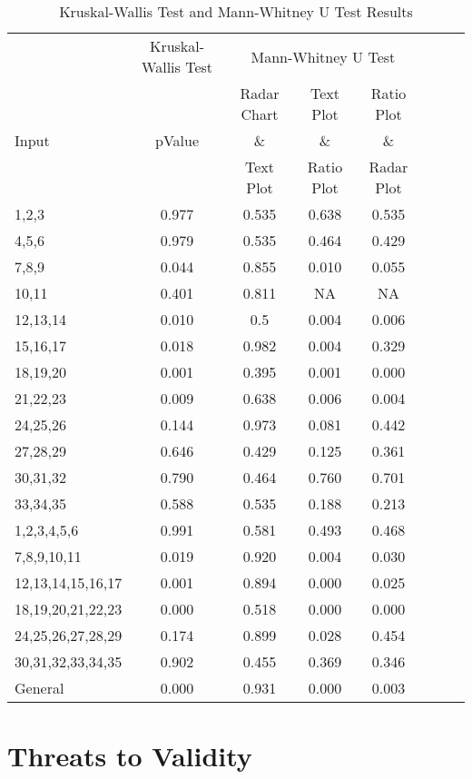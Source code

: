 \begin{table}[ht]
\centering
\begin{tabular}{@{\extracolsep{4pt}}lccccccc}
\toprule   
{} & {Kruskal-Wallis Test} & \multicolumn{3}{c}{Mann-Whitney U Test}\\
 \cmidrule{2-2} 
 \cmidrule{3-5} 
   &  & Radar Chart  & Text Plot  & Ratio Plot   \\ 
Input  & pValue & \&  & \&  & \& \\
   &  & Text Plot & Ratio Plot & Radar Plot\\
\midrule
1,2,3 & 0.977 & 0.535 & 0.638 & 0.535\\ 
4,5,6 & 0.979 & 0.535 & 0.464 & 0.429 \\ 
7,8,9 & 0.044 &  0.855 & 0.010 & 0.055  \\ 
10,11 & 0.401 & 0.811 & NA & NA \\ 
12,13,14 & 0.010 & 0.5 & 0.004 & 0.006  \\ 
15,16,17& 0.018 & 0.982  & 0.004 & 0.329 \\ 
18,19,20 & 0.001 & 0.395 & 0.001 & 0.000  \\ 
21,22,23 & 0.009 & 0.638 & 0.006 & 0.004  \\ 
24,25,26 & 0.144 & 0.973 & 0.081 & 0.442 \\ 
27,28,29 & 0.646 & 0.429 & 0.125 & 0.361 \\ 
30,31,32 & 0.790 & 0.464 & 0.760 & 0.701 \\ 
33,34,35 & 0.588 & 0.535 & 0.188 & 0.213\\ 
 \midrule
1,2,3,4,5,6 & 0.991 & 0.581 & 0.493 & 0.468\\ 
7,8,9,10,11 & 0.019 & 0.920 & 0.004 & 0.030\\ 
12,13,14,15,16,17 & 0.001 & 0.894 & 0.000 & 0.025\\
18,19,20,21,22,23 & 0.000 & 0.518 & 0.000 & 0.000 \\
24,25,26,27,28,29 & 0.174 & 0.899 & 0.028 & 0.454 \\
30,31,32,33,34,35 & 0.902 & 0.455 & 0.369 & 0.346 \\
 \midrule
 General & 0.000 & 0.931 & 0.000 & 0.003 \\
\bottomrule
\end{tabular}
\caption{Kruskal-Wallis Test and Mann-Whitney U Test Results} 
\end{table}

\section{Threats to Validity}

